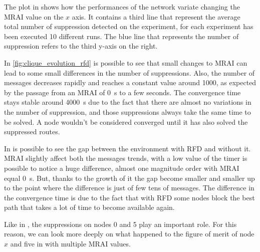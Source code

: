 The plot in  shows how the performances of the
network variate changing the \ac{MRAI} value on the $x$ axis.
It contains a third line that represent the average total number of suppression
detected on the experiment, for each experiment has been executed \num{10} different
runs.
The blue line that represents the number of suppression refers to the third y-axis
on the right.

In \cref{fig:clique_evolution_rfd} is possible to see that small changes to \ac{MRAI}
can lead to some small differences in the number of suppressions.
Also, the number of messages decreases rapidly and reaches a constant
value around \num{1000}, as expected by the passage from an \ac{MRAI} of \SI{0}{\second}
to a few seconds.
The convergence time stays stable around \SI{4000}{\second} due to the
fact that there are almost no variations in the number of suppression,
and those suppressions always take the same time to be solved.
A node wouldn't be considered converged until it has also solved the suppressed
routes.

In  is possible to see the
gap between the environment with \ac{RFD} and without it.
\ac{MRAI} slightly affect both the messages trends, with a low value of the timer
is possible to notice a huge difference, almost one magnitude order with \ac{MRAI}
equal \SI{0}{\second}.
But, thanks to the growth of it the gap become smaller and smaller up to
the point where the difference is just of few tens of messages.
The difference in the convergence time is due to the fact that with \ac{RFD} some
nodes block the best path that takes a lot of time to become available again.

Like in , the suppressions on nodes \num{0} and
\num{5} play an important role.
For this reason, we can look more deeply on what happened to the figure of merit
of node $x$ and five in  with multiple
\ac{MRAI} values.


